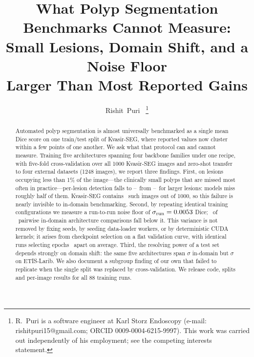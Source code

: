 \documentclass[journal]{IEEEtran}
\begin{document}
\title{What Polyp Segmentation Benchmarks Cannot Measure:\\
Small Lesions, Domain Shift, and a Noise Floor\\
Larger Than Most Reported Gains}

\author{Rishit~Puri~%
\thanks{R.~Puri is a software engineer at Karl Storz Endoscopy
(e-mail: rishitpuri15@gmail.com; \mbox{ORCID} 0009-0004-6215-9997).
This work was carried out independently of his employment; see the competing
interests statement.}}

\maketitle


\begin{abstract}
Automated polyp segmentation is almost universally benchmarked as a single
mean Dice score on one train/test split of Kvasir-SEG, where reported values
now cluster within a few points of one another. We ask what that protocol can
and cannot measure. Training five architectures spanning four backbone
families under one recipe, with five-fold cross-validation over all 1000
Kvasir-SEG images and zero-shot transfer to four external datasets (1248 images), we report three findings. First, on lesions occupying less than 1\%
of the image---the clinically small polyps that are missed most often in
practice---per-lesion detection falls to \detSmallLo--\detSmallHi\ from
\detLargeLo--\detLargeHi\ for larger lesions: models miss roughly half of
them. Kvasir-SEG contains \nSmallKvasir\ such images out of 1000, so this
failure is nearly invisible to in-domain benchmarking. Second, by repeating
identical training configurations we measure a run-to-run noise floor of
$\sigma_{\mathrm{run}}=0.0053$ Dice; \nBelowNoise\ of \nPairsTotal\
pairwise in-domain architecture comparisons fall below it. This variance is
not removed by fixing seeds, by seeding data-loader workers, or by
deterministic CUDA kernels; it arises from checkpoint selection on a flat
validation curve, with identical runs selecting epochs \meanDeltaEpoch\ apart
on average. Third, the resolving power of a test set depends strongly on
domain shift: the same five architectures span \sigmaInDomain$\sigma$
in-domain but \sigmaEtis$\sigma$ on ETIS-Larib. We also document a subgroup
finding of our own that failed to replicate when the single split was
replaced by cross-validation. We release code, splits and per-image results
for all 88 training runs.
\end{abstract}
\end{document}
